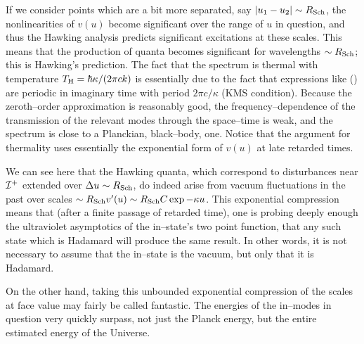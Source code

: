 If we consider points which are a bit more separated, say $|u_1-u_2|\sim R_{\rm
Sch}$, the nonlinearities of $v(u)$ become significant over the range of $u$ in
question, and thus the Hawking analysis predicts significant excitations at
these scales.  This means that the production of quanta becomes significant for
wavelengths $\sim R_{\rm Sch}$; this is Hawking's prediction.  The fact that
the spectrum is thermal with temperature $T_{\rm H}=\hbar\kappa /(2\pi ck)$ is
essentially due to the fact that expressions like (\renfun ) are periodic in
imaginary time with period $2\pi c/\kappa$ (KMS condition). Because the zeroth--order approximation is
reasonably good, the frequency--dependence of the transmission of the relevant
modes through the space--time is weak, and the spectrum is close to a
Planckian, black--body, one.  Notice that the argument for thermality uses
essentially the exponential form of $v(u)$ at late retarded times.

We can see here that the Hawking quanta, which correspond to disturbances near
${\cal I} ^+$ extended over $\Delta u\sim R_{\rm Sch}$, do indeed arise
from vacuum
fluctuations in the past over scales 
$\sim R_{\rm Sch}v'(u)\sim R_{\rm Sch}C\exp
-\kappa u$.  
This exponential compression means that (after a finite passage of
retarded time), one is probing deeply enough the ultraviolet
asymptotics of the in--state's two point function, that any such state
which is Hadamard will produce the same result.  In other words, it is
not necessary to assume that the in--state is the vacuum, but only
that it is Hadamard.

On the other hand, taking this unbounded exponential compression of
the scales at face value may fairly be called fantastic.  The energies
of the in--modes in question very quickly surpass, not just the Planck
energy, but the entire estimated energy of the Universe.

